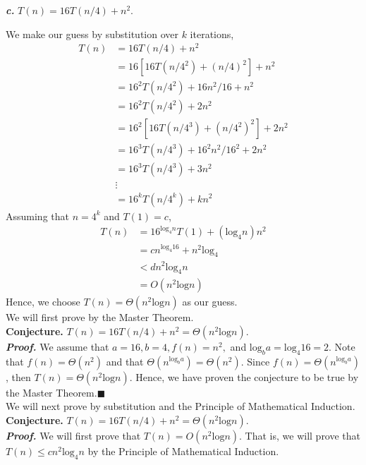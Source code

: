 \documentclass{article}
\begin{document}
\textit{\textbf{c.}} $T(n) = 16T(n / 4) + n^2.$
\begin{adjustwidth}{2.5em}{0pt}
We make our guess by substitution over $k$ iterations,
\begin{align*}
T(n) &= 16T(n / 4) + n^2 \\
&= 16[16T(n / 4^2) + (n/4)^2] + n^2\\
&= 16^2T(n / 4^2) + 16n^2/16 + n^2\\
&= 16^2T(n / 4^2) + 2n^2\\
&= 16^2[16T(n / 4^3) + (n/4^2)^2] + 2n^2\\
&= 16^3T(n / 4^3) + 16^2n^2/16^2 + 2n^2\\
&= 16^3T(n / 4^3) + 3n^2\\
&\vdots\\
&= 16^kT(n / 4^k) + kn^2
\end{align*}
Assuming that $n = 4^k$ and $T(1) = c$,
\begin{align*}
T(n) &= 16^{\text{log}_4 n}T(1) + (\text{log}_4 n)n^2\\
&= cn^{\text{log}_4 16} + n^2\text{log}_4\\
&< dn^2\text{log}_4 n\\
&= O(n^2\text{log} n)
\end{align*}
Hence, we choose $T(n) = \Theta(n^2\text{log} n)$ as our guess.\\

We will first prove by the Master Theorem.\\
\textbf{Conjecture.} $T(n) = 16T(n / 4) + n^2 = \Theta(n^2 \text{log}n).$\\
\textit{\textbf{Proof.}} We assume that $a = 16, b = 4, f(n) = n^2,$ and $\text{log}_b a = \text{log}_4 16 = 2$. Note that $f(n) = \Theta(n^2)$ and that $\Theta(n^{\text{log}_b a}) = \Theta(n^2)$. Since $f(n) = \Theta(n^{\text{log}_b a})$, then $T(n) = \Theta(n^2 \text{log} n)$. Hence, we have proven the conjecture to be true by the Master Theorem.\hfill$\blacksquare$\\

We will next prove by substitution and the Principle of Mathematical Induction.\\
\textbf{Conjecture.} $T(n) = 16T(n / 4) + n^2 = \Theta(n^2 \text{log}n).$\\
\textit{\textbf{Proof.}} We will first prove that $T(n) = O(n^2 \text{log}n).$ That is, we will prove that $T(n) \leq cn^2\text{log}_4 n$ by the Principle of Mathematical Induction.\\


\end{adjustwidth}
\end{document}

